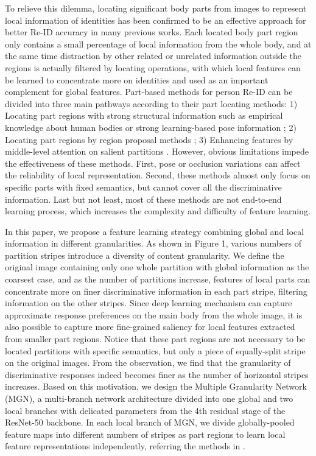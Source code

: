 \documentclass[sigconf]{acmart}
\begin{document}
To relieve this dilemma, locating significant body parts from images to represent local information of identities has been confirmed to be an effective approach for better Re-ID accuracy in many previous works. Each located body part region only contains a small percentage of local information from the whole body, and at the same time distraction by other related or unrelated information outside the regions is actually filtered by locating operations, with which local features can be learned to concentrate more on identities and used as an important complement for global features. Part-based methods for person Re-ID can be divided into three main pathways according to their part locating methods: 1) Locating part regions with strong structural information such as empirical knowledge about human bodies \cite{cheng2016perso,li2017person,sun2017beyond,zhang2017alignedreid} or strong learning-based pose information \cite{su2017pose,zhao2017spindle}; 2) Locating part regions by region proposal methods \cite{yao2017deep,li2017learning}; 3) Enhancing features by middle-level attention on salient partitions \cite{zhao2017deeply,liu2017hydraplus,liu2017end,li2018harmoniou}. However, obvious limitations impede the effectiveness of these methods. First, pose or occlusion variations can affect the reliability of local representation. Second, these methods almost only focus on specific parts with fixed semantics, but cannot cover all the discriminative information. Last but not least, most of these methods are not end-to-end learning process, which increases the complexity and difficulty of feature learning.

In this paper, we propose a feature learning strategy combining global and local information in different granularities. As shown in Figure 1, various numbers of partition stripes introduce a diversity of content granularity. We define the original image containing only one whole partition with global information as the coarsest case, and as the number of partitions increase, features of local parts can concentrate more on finer discriminative information in each part stripe, filtering information on the other stripes. Since deep learning mechanism can capture approximate response preferences on the main body from the whole image, it is also possible to capture more fine-grained saliency for local features extracted from smaller part regions. Notice that these part regions are not necessary to be located partitions with specific semantics, but only a piece of equally-split stripe on the original images. From the observation, we find that the granularity of discriminative responses indeed becomes finer as the number of horizontal stripes increases. Based on this motivation, we design the Multiple Granularity Network (MGN), a multi-branch network architecture divided into one global and two local branches with delicated parameters from the 4th residual stage of the ResNet-50 \cite{he2016deep} backbone. In each local branch of MGN, we divide globally-pooled feature maps into different numbers of stripes as part regions to learn local feature representations independently, referring the methods in \cite{sun2017beyond}. 
\end{document}
